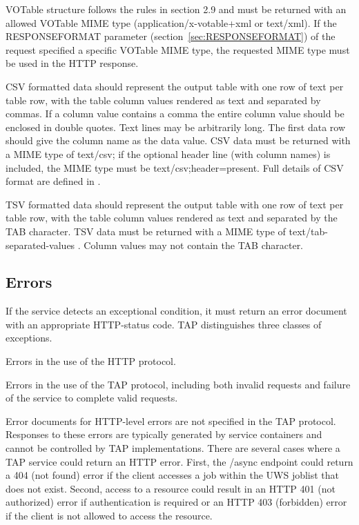 \documentclass[11pt,letter]{ivoa}
\begin{document}
VOTable structure follows the rules in section 2.9 and must be returned with an 
allowed VOTable MIME type (application/x-votable+xml or text/xml). If the 
RESPONSEFORMAT parameter (section~\ref{sec:RESPONSEFORMAT}) of the request 
specified a specific VOTable MIME type, the requested MIME type must be used 
in the HTTP response.

CSV formatted data should represent the output table with one row of text per 
table row, with the table column values rendered as text and separated by 
commas. If a column value contains a comma the entire column value should be 
enclosed in double quotes.  Text lines may be arbitrarily long.  The first data 
row should give the column name as the data value.   CSV data must be returned 
with a MIME type of text/csv; if the optional header line (with column names) 
is included, the MIME type must be text/csv;header=present. Full details of CSV 
format are defined in \citep{std:CSV}.

TSV formatted data should represent the output table with one row of text per 
table row, with the table column values rendered as text and separated by the 
TAB character. TSV data must be returned with a MIME type of 
text/tab-separated-values \citep{std:TSV}. Column values may not contain the 
TAB 
character.

\subsection{Errors}
\label{sec:query-error}

If the service detects an exceptional condition, it must return an error 
document with an appropriate HTTP-status code. TAP distinguishes three classes 
of exceptions.

Errors in the use of the HTTP protocol. 

Errors in the use of the TAP protocol, including both invalid requests and 
failure of the service to complete valid requests. 

Error documents for HTTP-level errors are not specified in the TAP protocol. 
Responses to these errors are typically generated by service containers and 
cannot be controlled by TAP implementations. There are several cases where a 
TAP 
service could return an HTTP error. First, the /async endpoint could return a 
404 (not found) error if the client accesses a job within the UWS joblist that 
does not exist. Second, access to a resource could result in an HTTP 401 (not 
authorized) error if authentication is required or an HTTP 403 (forbidden) 
error if the client is not allowed to access the resource.
\end{document}
